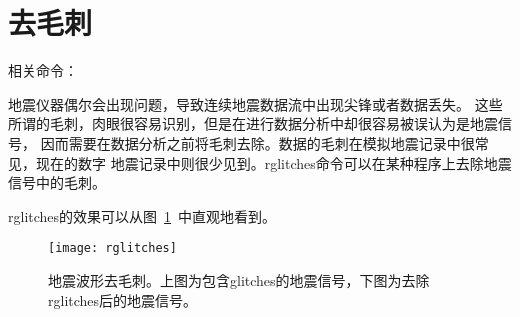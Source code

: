 \section{去毛刺}
相关命令：

地震仪器偶尔会出现问题，导致连续地震数据流中出现尖锋或者数据丢失。
这些所谓的毛刺，肉眼很容易识别，但是在进行数据分析中却很容易被误认为是地震信号，
因而需要在数据分析之前将毛刺去除。数据的毛刺在模拟地震记录中很常见，现在的数字
地震记录中则很少见到。rglitches命令可以在某种程序上去除地震信号中的毛刺。

rglitches的效果可以从图~\ref{fig:deglitches}~中直观地看到。

\begin{figure}[H]
\centering
\texttt{[image: rglitches]}
\caption[地震波形去毛刺]{地震波形去毛刺。上图为包含glitches的地震信号，下图为去除
rglitches后的地震信号。}
\label{fig:deglitches}
\end{figure}
